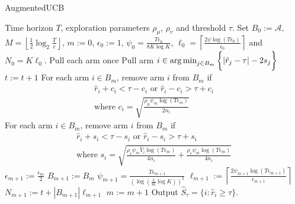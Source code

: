 \begin{algorithm}[th!]
\caption{AugmentedUCB}
\label{alg:augucb}
\begin{algorithmic}
 Time horizon $T$, exploration parameters $\rho_{\mu}$, $\rho_v$ and threshold $\tau$.
 Set $B_{0}:=\mathcal{A}$, $M=\left\lfloor \frac{1}{2}\log_{2} \frac{T}{e}\right\rfloor $, $m:=0$, $\epsilon_{0}:=1$, $\psi_{0}=\frac{T\epsilon_{0}}{8K\log K}$, $\ell_{0}=\left\lceil \frac{2\psi\log( T\epsilon_{0})}{\epsilon_{0}} \right\rceil$ and $N_{0}=K\ell_{0} $.
\State Pull each arm once
\State {}
\State Pull arm $i\in\operatorname*{arg\,min}_{j\in B_{m}}\bigg\lbrace |\hat{r}_{j} - \tau | - 2s_{j}\bigg\rbrace$
\State $t:=t+1$ 
\ArmElim
\State For each arm $i \in B_{m}$, remove arm ${i}$ from $B_{m}$ if
\begin{align*}
\hat{r}_{i} + c_i  < \tau - c_i \mbox{ or } \hat{r}_{i} - c_i  > \tau + c_i \\
\text{where $c_i=\sqrt{\frac{\rho_{\mu}\psi_{m}\log{( T\epsilon_{m})}}{2 n_{i}}}$}
\end{align*}
\EndArmElim
\ArmElimV
\State For each arm $i \in B_{m}$, remove arm ${i}$ from $B_{m}$ if
\begin{align*}
\hat{r}_{i} + s_i  < \tau - s_i \mbox{ or } \hat{r}_{i} - s_i  > \tau + s_i \\
\text{where $s_i=\sqrt{\frac{\rho_v\psi_{m}\hat{V}_{i}\log{( T\epsilon_{m})}}{4 n_{i}} + \frac{\rho_v\psi_{m} \log{(T\epsilon_{m})}}{4 n_{i}}}$}
\end{align*}
\EndArmElimV
\State {}
\ResetParam
\State $\epsilon_{m+1}:=\frac{\epsilon_{m}}{2}$
\State $B_{m+1} := B_{m}$
\State $\psi_{m+1}=\frac{T\epsilon_{m+1}}{(\log(\frac{3}{16}\log K))^{2}}$
\State $\ell_{m+1}:=\left\lceil \frac{2\psi_{m+1}\log( T\epsilon_{m+1})}{\epsilon_{m+1}} \right\rceil$
\State $N_{m+1} := t + |B_{m+1}|\ell_{m+1}$
\State $m := m+1$
\EndResetParam
\EndIf
\EndFor
\State Output $\hat{S}_{\tau}=\lbrace i: \hat{r}_{i}\geq \tau \rbrace$.
\end{algorithmic}
\end{algorithm}

